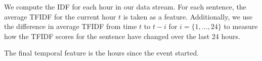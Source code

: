 We compute the IDF for each hour in our data stream. 
For each sentence, the average TFIDF for the current hour $t$ is taken as a 
feature. Additionally, we use the difference in average TFIDF from time $t$
to $t-i$ for $i = \{1, \ldots, 24\}$ to measure how the TFIDF scores for the 
sentence have changed over the last 24 hours. 

The final temporal feature is the hours since the event started.






